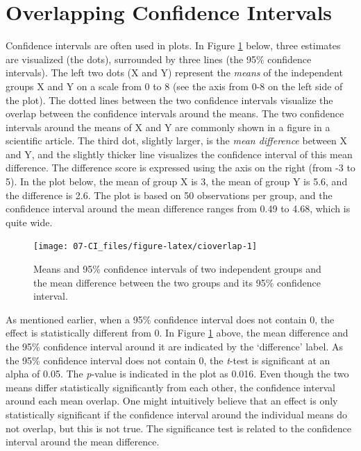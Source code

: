 \documentclass[
  oneside]{krantz}
\begin{document}
\hypertarget{overlapping-confidence-intervals}{%
\section{Overlapping Confidence Intervals}\label{overlapping-confidence-intervals}}

Confidence intervals are often used in plots. In Figure \ref{fig:cioverlap} below, three estimates are visualized (the dots), surrounded by three lines (the 95\% confidence intervals). The left two dots (X and Y) represent the \emph{means} of the independent groups X and Y on a scale from 0 to 8 (see the axis from 0-8 on the left side of the plot). The dotted lines between the two confidence intervals visualize the overlap between the confidence intervals around the means. The two confidence intervals around the means of X and Y are commonly shown in a figure in a scientific article. The third dot, slightly larger, is the \emph{mean difference} between X and Y, and the slightly thicker line visualizes the confidence interval of this mean difference. The difference score is expressed using the axis on the right (from -3 to 5). In the plot below, the mean of group X is 3, the mean of group Y is 5.6, and the difference is 2.6. The plot is based on 50 observations per group, and the confidence interval around the mean difference ranges from 0.49 to 4.68, which is quite wide.



\begin{figure}

{\centering \texttt{[image: 07-CI\_files/figure-latex/cioverlap-1]} 

}

\caption{Means and 95\% confidence intervals of two independent groups and the mean difference between the two groups and its 95\% confidence interval.}\label{fig:cioverlap}
\end{figure}

As mentioned earlier, when a 95\% confidence interval does not contain 0, the effect is statistically different from 0. In Figure \ref{fig:cioverlap} above, the mean difference and the 95\% confidence interval around it are indicated by the `difference' label. As the 95\% confidence interval does not contain 0, the \emph{t}-test is significant at an alpha of 0.05. The \emph{p}-value is indicated in the plot as 0.016. Even though the two means differ statistically significantly from each other, the confidence interval around each mean overlap. One might intuitively believe that an effect is only statistically significant if the confidence interval around the individual means do not overlap, but this is not true. The significance test is related to the confidence interval around the mean difference.
\end{document}
